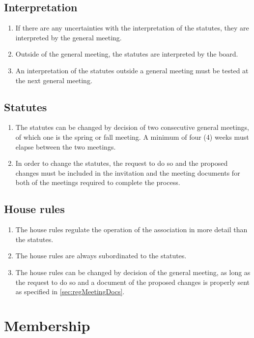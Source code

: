 \subsection{Interpretation}
\begin{enumerate}
  \item If there are any uncertainties with the interpretation of the statutes, they are interpreted by the general meeting.
  \item Outside of the general meeting, the statutes are interpreted by the board.
  \item An interpretation of the statutes outside a general meeting must be tested at the next general meeting.
\end{enumerate}

\subsection{Statutes}
\begin{enumerate}
  \item The statutes can be changed by decision of two consecutive general meetings, of which one is the spring or fall meeting. A minimum of four (4) weeks must elapse between the two meetings.
  \item In order to change the statutes, the request to do so and the proposed changes must be included in the invitation and the meeting documents for both of the meetings required to complete the process.   
\end{enumerate}

\subsection{House rules}
\begin{enumerate}
  \item The house rules regulate the operation of the association in more detail than the statutes. 
  \item The house rules are always subordinated to the statutes.
  \item The house rules can be changed by decision of the general meeting, as long as the request to do so and a document of the proposed changes is properly sent as specified in \ref{sec:regMeetingDocs}.
\end{enumerate}

\section*{Membership}

